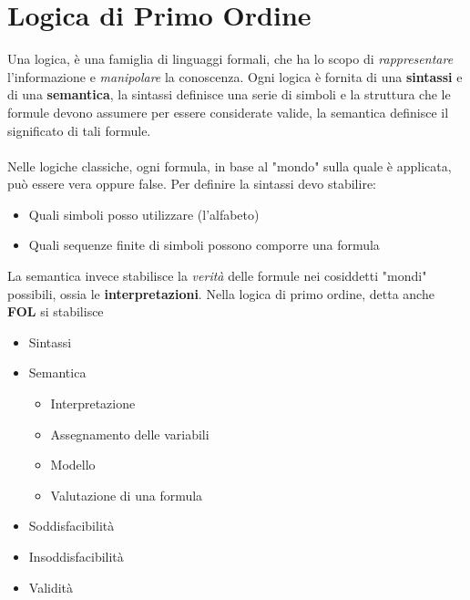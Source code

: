\documentclass[12pt, letterpaper]{article}
\newcommand{\acc}{\\\hphantom{}\\}
\begin{document}
\section{Logica di Primo Ordine}
Una logica, è una famiglia di linguaggi formali, che ha lo scopo di \textit{rappresentare} l'informazione e 
\textit{manipolare} la conoscenza. Ogni logica è fornita di una \textbf{sintassi} e di una \textbf{semantica}, la sintassi 
definisce una serie di simboli e la struttura che le formule devono assumere per essere considerate valide, la semantica 
definisce il significato di tali formule.\acc 
Nelle logiche classiche, ogni formula, in base al "mondo" sulla quale è applicata, può essere vera oppure false. 
Per definire la sintassi devo stabilire:\begin{itemize}
    \item Quali simboli posso utilizzare (l'alfabeto)
    \item Quali sequenze finite di simboli possono comporre una formula
\end{itemize}
La semantica invece stabilisce la \textit{verità} delle formule nei cosiddetti "mondi" possibili, ossia 
le \textbf{interpretazioni}. Nella logica di primo ordine, detta anche \textbf{FOL} si stabilisce\begin{itemize}
    \item Sintassi 
    \item Semantica \begin{itemize}
        \item Interpretazione 
        \item Assegnamento delle variabili 
        \item Modello 
        \item Valutazione di una formula 
    \end{itemize}
    \item Soddisfacibilità 
    \item Insoddisfacibilità
    \item Validità
\end{itemize}
\end{document}
